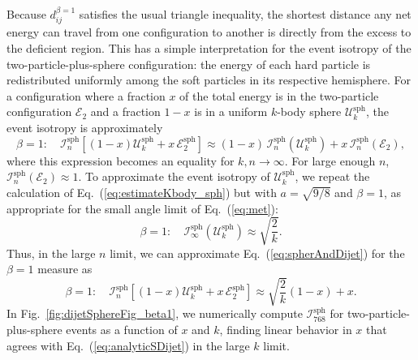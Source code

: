 \documentclass[letterpaper,11pt]{article}
\newcommand{\iso}[2]{\mathcal{I}^\text{#1}_{#2}}
\DeclareRobustCommand{\Fig}[1]{Fig.~\ref{#1}}
\DeclareRobustCommand{\Eq}[1]{Eq.~(\ref{#1})}
\begin{document}
Because $d_{ij}^{\beta=1}$ satisfies the usual triangle inequality, the shortest distance any net energy can travel from one configuration to another is directly from the excess to the deficient region. 
%
This has a simple interpretation for the event isotropy of the two-particle-plus-sphere configuration:  the energy of each hard particle is redistributed uniformly among the soft particles in its respective hemisphere. 
%
For a configuration where a fraction $x$ of the total energy is in the two-particle configuration $\mathcal{E}_2$ and a fraction $1-x$ is in a uniform $k$-body sphere $\mathcal{U}^\text{sph}_k$, the event isotropy is approximately
%
\begin{equation}
\beta =1: \quad \iso{sph}{n}\left[ (1-x)\mathcal{U}^\text{sph}_{k} + x \, \mathcal{E}^\text{sph}_2 \right] \approx (1-x) \, \iso{sph}{n}( \mathcal{U}^\text{sph}_{k}) + x \, \iso{sph}{n}(\mathcal{E}_2),
\label{eq:spherAndDijet}
\end{equation}
%
where this expression becomes an equality for $k,n \to \infty$.
%
For large enough $n$, $\iso{sph}{n}(\mathcal{E}_2) \approx 1$.
%
To approximate the event isotropy of $\mathcal{U}^\text{sph}_{k}$, we repeat the calculation of \Eq{eq:estimateKbody_sph} but with $a = \sqrt{9/8}$ and $\beta = 1$, as appropriate for the small angle limit of \Eq{eq:met}:
%
\begin{equation}
\beta =1: \quad \iso{sph}{\infty}\left( \mathcal{U}^\text{sph}_{k} \right) \approx \sqrt{\frac{2}{k}}.
\end{equation}
%
Thus, in the large $n$ limit, we can approximate \Eq{eq:spherAndDijet} for the $\beta =1$ measure as 
%
\begin{equation}
\beta =1: \quad \iso{sph}{n}\left[ (1-x)\mathcal{U}^\text{sph}_{k} + x \, \mathcal{E}^\text{sph}_2 \right] \approx \sqrt{\frac{2}{k}}(1-x) + x.
\label{eq:analyticSDijet}
\end{equation}
%
In \Fig{fig:dijetSphereFig_beta1}, we numerically compute $\iso{sph}{768}$ for two-particle-plus-sphere events as a function of $x$ and $k$, finding linear behavior in $x$ that agrees with \Eq{eq:analyticSDijet} in the large $k$ limit.
\end{document}
